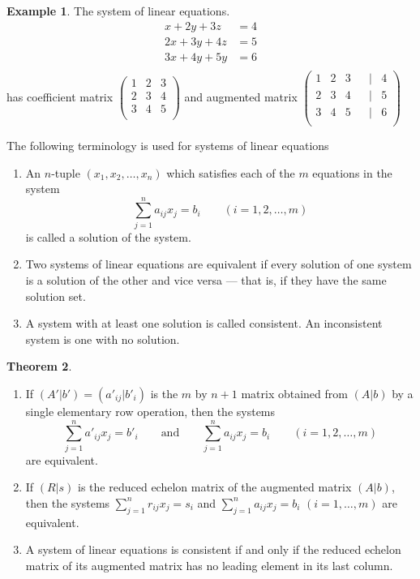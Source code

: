 \documentclass[11pt,a4paper]{article}
\theoremstyle{definition}
\newtheorem{thm}{Theorem}[subsection]
\newtheorem{exa}[thm]{Example}
\begin{document}
\begin{exa}
The system of linear equations.
\begin{align*}
x+2y+3z&=4\\2x+3y+4z&=5\\3x+4y+5y&=6\\
\end{align*}
has coefficient matrix
$
\begin{pmatrix}
1&2&3\\2&3&4\\3&4&5\\
\end{pmatrix}
$
and augmented matrix
$
\begin{pmatrix}
1&2&3&&|&4\\2&3&4&&|&5\\3&4&5&&|&6\\
\end{pmatrix}
$


The following terminology is used for systems of linear equations
\begin{enumerate}
\item An $n$-tuple $(x_1,x_2,\dots,x_n)$ which satisfies each of the $m$
equations in the system $$\sum^n_{j=1}a_{ij}x_j=b_i\qquad(i=1,2,\dots,m)$$ is
called a solution of the system.
\item Two systems of linear equations are equivalent if every solution of one
system is a solution of the other and vice versa --- that is, if they have the
same solution set.
\item A system with at least one solution is called consistent. An inconsistent
system is one with no solution.
\end{enumerate}
\end{exa}

\begin{thm}\label{thm:row-ops-systems}
\begin{enumerate}
\item If $(A'|b')=(a'_{ij}|b'_i)$ is the $m$ by $n+1$ matrix obtained from
$(A|b)$ by a single elementary row operation, then the systems
$$\sum^n_{j=1}a'_{ij}x_j=b'_i \qquad\text{and}\qquad \sum^n_{j=1}a_{ij}x_j=b_i
\qquad(i=1,2,\dots,m)$$
are equivalent.
\item If $(R|s)$ is the reduced echelon matrix of the augmented matrix $(A|b)$,
then the systems $\sum^n_{j=1}r_{ij}x_j=s_i$ and $\sum^n_{j=1}a_{ij}x_j=b_i$
$(i=1,\dots,m)$ are equivalent.
\item A system of linear equations is consistent if and only if the reduced
echelon matrix of its augmented matrix has no leading element in its last
column.
\end{enumerate}
\end{thm}
\end{document}
